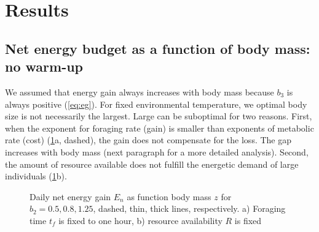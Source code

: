 \section*{Results}
\subsection*{Net energy budget as a function of body mass: no warm-up}
We assumed that energy gain always increases with body mass because $b_3$ is always positive (\cref{eq:eg}).
For fixed environmental temperature, we optimal body size is not necessarily the largest. 
Large can be suboptimal for two reasons. 
First, when the exponent for foraging rate (gain) is smaller than exponents of metabolic rate (cost) (\cref{fig1}a, dashed), the gain does not compensate for the loss. 
The gap increases with body mass (next paragraph for a more detailed analysis). 
Second, the amount of resource available does not fulfill the energetic demand of large individuals (\cref{fig1}b).

\begin{figure}
\begin{center}
\caption{
	Daily net energy gain  $E_n$ as function body mass $z$ for $b_2 = 0.5, 0.8, 1.25$, dashed, thin, thick lines, respectively.
	a) Foraging time $t_f$ is fixed to one hour, b) resource availability $R$ is fixed
}%
\label{fig1}
\end{center}
\end{figure}

